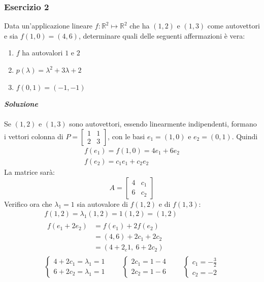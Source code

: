 \documentclass[italian]{article}
\newcommand{\ins}[1]{\text{$\mathbb{#1}$}}
\begin{document}
\subsubsection{Esercizio 2}
Data un'applicazione lineare $f: \ins{R}^2 \longmapsto \ins{R}^2$ che ha $(1,2)$ e $(1,3)$ come autovettori e sia $f(1,0)=(4,6)$, determinare quali delle seguenti affermazioni è vera:
\begin{enumerate}[label=\alph*)]
	\item $f$ ha autovalori $1$ e $2$
	\item $p(\lambda) = \lambda^2 + 3\lambda + 2$
	\item $f(0,1) = (-1,-1)$
\end{enumerate}
\textbf{\textit{Soluzione}}\\\\
Se $(1,2)$ e $(1,3)$ sono autovettori, essendo linearmente indipendenti, formano i vettori colonna di $P = \begin{bmatrix}1&1 \\ 2&3\end{bmatrix}$, con le basi $e_1 = (1,0)$ e $e_2=(0,1)$.
Quindi
\begin{gather*}
	f(e_1) = f(1,0) = 4e_1 + 6e_2 \\
	f(e_2) = c_1e_1 + c_2e_2
\end{gather*}
La matrice sarà:
\[
	A = 
	\begin{bmatrix}
		4 & c_1 \\ 6 & c_2
	\end{bmatrix}
\]
Verifico ora che $\lambda_1=1$ sia autovalore di $f(1,2)$ e di $f(1,3)$:
\begin{gather*}
	f(1,2) = \lambda_1(1,2) = 1(1,2) = (1,2) \\
	\begin{split}
		f(e_1 + 2e_2) &= f(e_1) + 2f(e_2) \\
		&= (4,6) + 2c_1+2c_2 \\
		&= (4+2_c1,\ 6+2c_2)
	\end{split}\\
	\begin{cases*}
		4+2c_1 = \lambda_1 = 1 \\
		6+2c_2 = \lambda_1 = 1
	\end{cases*}
	\qquad
	\begin{cases*}
		2c_1 = 1 - 4 \\
		2c_2 = 1 - 6
	\end{cases*}
	\qquad
	\begin{cases*}
		c_1 = -\frac{3}{2} \\
		c_2 = -2
	\end{cases*}
\end{gather*}
\end{document}
